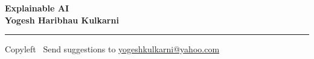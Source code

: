 
\graphicspath{{images/}}

\footnotesize


\begin{center}
\Large{\textbf{Explainable AI\\ Yogesh Haribhau Kulkarni}}  
\end{center}

\begin{multicols}{2}


\end{multicols}

\rule{\linewidth}{0.25pt}
\scriptsize
Copyleft \textcopyleft\  Send suggestions to 
\href{http://yati.io}{yogeshkulkarni@yahoo.com}



